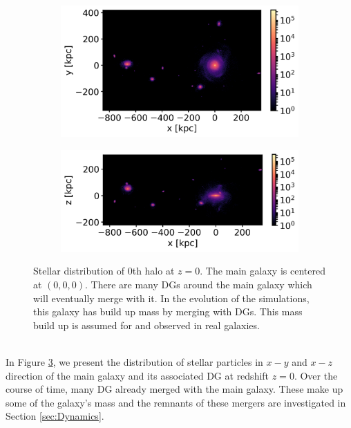 \begin{figure}[htbp]
\captionsetup{format=plain}
    \centering
    \begin{subfigure}[b]{0.8\textwidth}
	    \includegraphics[width=\textwidth]{plots/Auriga/Au24_stars_xy_distribution_halo0.png}
	    \label{fig:Au24_stars_xy}
    \end{subfigure}
    
    \begin{subfigure}[b]{0.8\textwidth}
    \centering
    	\includegraphics[width=\textwidth]{plots/Auriga/Au24_stars_xz_distribution_halo0.png}
    	\label{fig:Au24_stars_xz}
    \end{subfigure}
    \caption{Stellar distribution of 0th halo at $\textit{z}=0$. The main galaxy is centered at $(0,0,0)$. There are many \acp{DG} around the main galaxy which will eventually merge with it. In the evolution of the simulations, this galaxy has build up mass by merging with \acp{DG}. This mass build up is assumed for and observed in real galaxies.}\label{fig:Stars_AU24}
\end{figure}
\\In Figure \ref{fig:Stars_AU24}, we present the distribution of stellar particles in $x-y$ and $x-z$ direction of the main galaxy and its associated \ac{DG} at redshift $z=0$. Over the course of time, many \ac{DG} already merged with the main galaxy. These make up some of the galaxy's mass and the remnants of these mergers are investigated in Section \ref{sec:Dynamics}.\\
